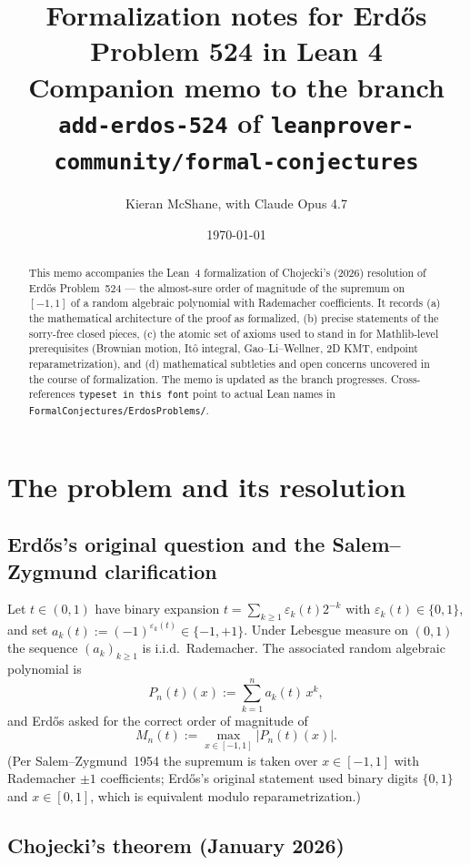 \documentclass[11pt]{article}
\title{Formalization notes for Erdős Problem 524 in Lean 4\\
\large Companion memo to the branch \texttt{add-erdos-524} of
\texttt{leanprover-community/formal-conjectures}}
\author{Kieran McShane, with Claude Opus 4.7}
\date{\today}
\theoremstyle{plain}
\theoremstyle{definition}
\theoremstyle{remark}
\newcommand{\supnorm}{M}
\newcommand{\eps}{\varepsilon}
\begin{document}
\maketitle

\begin{abstract}
This memo accompanies the Lean~4 formalization of Chojecki's (2026)
resolution of Erdős Problem~524 — the almost-sure order of magnitude of the
supremum on $[-1,1]$ of a random algebraic polynomial with Rademacher
coefficients. It records
(a) the mathematical architecture of the proof as formalized,
(b) precise statements of the sorry-free closed pieces,
(c) the atomic set of axioms used to stand in for Mathlib-level
prerequisites (Brownian motion, Itô integral, Gao–Li–Wellner, 2D KMT,
endpoint reparametrization), and
(d) mathematical subtleties and open concerns uncovered in the course of
formalization. The memo is updated as the branch progresses. Cross-references
\texttt{typeset in this font} point to actual Lean names in
\texttt{FormalConjectures/ErdosProblems/}.
\end{abstract}

\tableofcontents

\section{The problem and its resolution}

\subsection{Erdős's original question and the Salem–Zygmund clarification}

Let $t \in (0,1)$ have binary expansion $t = \sum_{k\ge 1} \eps_k(t) 2^{-k}$
with $\eps_k(t) \in \{0,1\}$, and set $a_k(t) := (-1)^{\eps_k(t)} \in
\{-1,+1\}$. Under Lebesgue measure on $(0,1)$ the sequence $(a_k)_{k\ge 1}$
is i.i.d.\ Rademacher. The associated random algebraic polynomial is
\[
  P_n(t)(x) := \sum_{k=1}^n a_k(t)\, x^k,
\]
and Erdős asked for the correct order of magnitude of
\[
  \supnorm_n(t) := \max_{x\in[-1,1]} |P_n(t)(x)|.
\]
(Per Salem–Zygmund~1954 the supremum is taken over $x \in [-1,1]$ with
Rademacher $\pm 1$ coefficients; Erdős's original statement used binary
digits $\{0,1\}$ and $x \in [0,1]$, which is equivalent modulo
reparametrization.)

\subsection{Chojecki's theorem (January 2026)}
\end{document}
